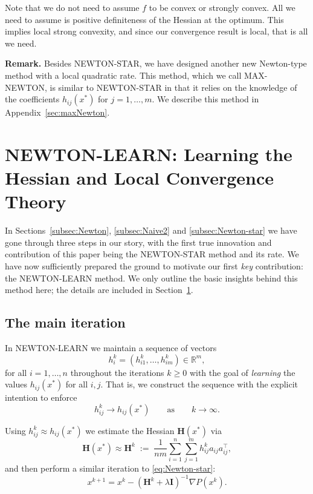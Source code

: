\documentclass[10pt]{article}
\newcommand{\squeeze}{}
\newcommand{\eqdef}{\; { := }\;}
\newcommand{\R}{\mathbb{R}}
\newcommand{\newalpha}{h}
\newcommand{\mH}{\mathbf{H}}
\newcommand{\mI}{\mathbf{I}}
\begin{document}
Note that we do not need to assume $f$ to be convex or strongly convex. All we need to assume is positive definiteness of the Hessian at the optimum. This implies local strong convexity, and since our convergence result is local, that is all we need.

{\bf Remark.} Besides  {\sf NEWTON-STAR}, we have designed another new Newton-type method with a local quadratic rate.  This method, which we call {\sf MAX-NEWTON}, is  similar to {\sf NEWTON-STAR} in that it relies on the knowledge of the coefficients $\newalpha_{ij}(x^*)$  for $j=1,\dots,m$. We describe this method in Appendix~\ref{sec:maxNewton}. 

\section{{\sf NEWTON-LEARN}: Learning the Hessian and Local Convergence Theory} \label{sec:Newton-learn}

In Sections~\ref{subsec:Newton}, \ref{subsec:Naive2} and \ref{subsec:Newton-star} we have gone through three steps in our story,  with the first true innovation and contribution of this paper being the {\sf NEWTON-STAR} method and its rate. We have now sufficiently prepared the ground to motivate our first {\em key} contribution: the {\sf NEWTON-LEARN} method. We only outline the basic insights behind this method here; the details are included in Section~\ref{sec:Newton-learn}.  



\subsection{The main iteration}
In {\sf NEWTON-LEARN} we maintain a sequence of vectors \begin{equation}\label{eq:h_i^k}h_i^k=(h_{i1}^k,\dots, h_{im}^k) \in \R^m, \nonumber \end{equation} for all $i=1,\dots,n$ throughout the iterations $k\geq 0$  with the goal of {\em learning} the values $\newalpha_{ij}(x^*)$ for all $i,j$. That is, we construct the sequence with the explicit intention to enforce 
\begin{equation}\label{eq:learn} h_{ij}^k \to \newalpha_{ij}(x^*) \qquad \text{as} \qquad k\to \infty.\end{equation}

Using $h_{ij}^k \approx \newalpha_{ij}(x^*)$ we  estimate the Hessian $\mH(x^*)$ via
\begin{equation}\label{eq:Newton2-xx} 
\squeeze \mH(x^*) \approx \mH^k \eqdef  \frac{1}{nm}\sum \limits_{i=1}^n \sum \limits_{j=1}^m h^k_{ij}  a_{ij}a_{ij}^\top,\end{equation}
and then perform a similar iteration to \eqref{eq:Newton-star}:
\begin{equation} \label{eq:Newton-learn} x^{k+1} = x^k - \left(\mH^k + \lambda \mI\right)^{-1} \nabla P(x^k).\end{equation}
\end{document}
